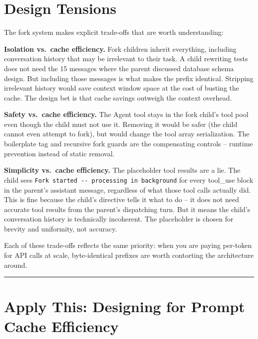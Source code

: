 \documentclass[
  english,
  11pt,
  letterpaper,
]{book}
\begin{document}
\section{Design Tensions}\label{design-tensions}

The fork system makes explicit trade-offs that are worth understanding:

\textbf{Isolation vs.~cache efficiency.} Fork children inherit
everything, including conversation history that may be irrelevant to
their task. A child rewriting tests does not need the 15 messages where
the parent discussed database schema design. But including those
messages is what makes the prefix identical. Stripping irrelevant
history would save context window space at the cost of busting the
cache. The design bet is that cache savings outweigh the context
overhead.

\textbf{Safety vs.~cache efficiency.} The Agent tool stays in the fork
child's tool pool even though the child must not use it. Removing it
would be safer (the child cannot even attempt to fork), but would change
the tool array serialization. The boilerplate tag and recursive fork
guards are the compensating controls -- runtime prevention instead of
static removal.

\textbf{Simplicity vs.~cache efficiency.} The placeholder tool results
are a lie. The child sees
\texttt{\textquotesingle{}Fork\ started\ -\/-\ processing\ in\ background\textquotesingle{}}
for every tool\_use block in the parent's assistant message, regardless
of what those tool calls actually did. This is fine because the child's
directive tells it what to do -- it does not need accurate tool results
from the parent's dispatching turn. But it means the child's
conversation history is technically incoherent. The placeholder is
chosen for brevity and uniformity, not accuracy.

Each of these trade-offs reflects the same priority: when you are paying
per-token for API calls at scale, byte-identical prefixes are worth
contorting the architecture around.

\begin{center}\rule{0.5\linewidth}{0.5pt}\end{center}

\section{Apply This: Designing for Prompt Cache
Efficiency}\label{apply-this-designing-for-prompt-cache-efficiency}
\end{document}
